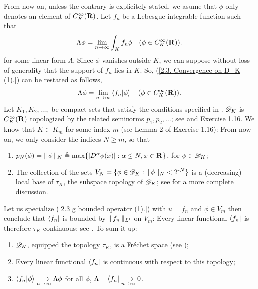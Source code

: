 From now on, unless the contrary is explicitely stated, %
we asume that $\phi$ only denotes an element of $C_K^\infty(\R)$. 
Let $f_n$ be a Lebesgue integrable function such that %
%
  \begin{align}\label{2.3. Convergence on D_K (1).}
    \Lambda \phi = \underset{n \to \infty}{\lim} 
      \int_{K} f_n\phi 
      \quad (\phi \in C_K^\infty(\R)).
  \end{align}
%
for some linear form $\Lambda$. %
%
Since $\phi$ vanishes outside $K$, we can suppose without loss of generality %
that the support of $f_n$ lies in $K$. So, %
%
  (\ref{2.3. Convergence on D_K (1).}) %
% 
can be restated as follows, 
%
  \begin{align}
    \Lambda \phi = \underset{n \to \infty}{\lim} 
      \bra{f_n}\ket{\phi} 
      \quad (\phi \in C_K^\infty(\R)).
  \end{align}
%
Let $K_1, K_2, \dots, $ be compact sets that satisfy the conditions 
specified in . %
$\D_K$ is $C_K^\infty(\R)$ topologized by the related seminorms %
%
  $p_1, p_2, \dots$; see  and Exercise 1.16.
%
We know that $K\subset K_m$ for some index $m$ %
(see Lemma 2 of Exercise 1.16): From now on, we only consider the indices 
$N \geq m$, so that%
%
  \renewcommand{\labelenumi}{(\alph{enumi})}%
  \begin{enumerate}
    \item{
      $p_N(\phi) = \norm{N}{\phi} \Def \max 
      \set{\lvert D^{\alpha}\phi(x) \rvert}{\alpha \leq N, x \in \R}$, %
      for $\phi \in \D_K$;
    }
    \item{
      The collection of the sets %
      $V_N = \set{ \phi \in \D_K}{ \norm{N}{\phi} < 2^{\minus N}}$ %
      is a (decreasing) local base of $\tau_K$, the subspace topology of $\D_K$; %
      see  for a more complete discussion.
    }
  \end{enumerate}
  \renewcommand{\labelenumi}{(\roman{enumi})}
%
Let us specialize (\ref{2.3  g  bounded operator (1).}) with %
%
  $u=f_n$ and $ \phi \in V_m$ %
%
then conclude that $\bra{f_n}$ is bounded by $\norm{L^1}{f_n}$ on $V_m$: %
Every linear functional $\bra{f_n}$ is therefore $\tau_K$-continuous; see %
%
  . \newline\newline\noindent
%
To sum it up: %
%
  \begin{enumerate}
    \item{$\D_K$, equipped the topology $\tau_K$, is a Fréchet space %
      (see )};
    \item{Every linear functional $\bra{f_n}$ is continuous %
      with respect to this topology;}
    \item{
      $\bra{f_n}\ket{\phi} \tendsto{n}{\infty} \Lambda \phi$ for all $\phi$, 
        \ie 
      $ \Lambda-\bra{f_n} \tendsto{n}{\infty}0$.
    }
  \end{enumerate}

